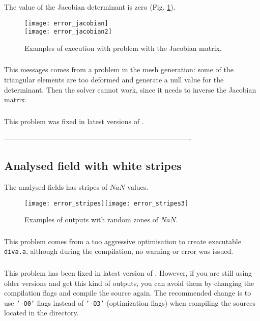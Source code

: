 The value of the Jacobian determinant is zero (Fig. \ref{fig:error_jacobian}).
\begin{figure}[htpb]
\centering
\texttt{[image: error\_jacobian]}\\
\texttt{[image: error\_jacobian2]}
\caption{Examples of \diva execution with problem with the Jacobian matrix. \label{fig:error_jacobian}}
\end{figure}

\subsubsection{\question}

This messages comes from a problem in the mesh generation: some of the triangular elements are too deformed and generate a null value for the determinant. Then the solver cannot work, since it needs to inverse the Jacobian matrix.


\subsubsection{\answer}

This problem was fixed in latest versions of \diva. 

-------------------------------------------------------------------------------

\subsection{Analysed field with white stripes}

The analysed fields has stripes of $NaN$ values.

\begin{figure}[htpb]
\centering
\texttt{[image: error\_stripes]}\texttt{[image: error\_stripes3]}
\caption{Examples of \diva outputs with random zones of $NaN$.\label{fig:error_stripes}}
\end{figure}

\subsubsection{\question}

This problem comes from a too aggressive optimisation to create executable \texttt{diva.a}, although during the compilation, no warning or error was issued.  

\subsubsection{\answer}

This problem has been fixed in latest version of \diva. However, if you are still using older versions and get this kind of outputs, you can avoid them by changing the compilation flags and compile the source again. The recommended change is to use \texttt{'-O0'} flags instead of \texttt{'-O3'} (optimization flags) when compiling the sources located in the  directory.
